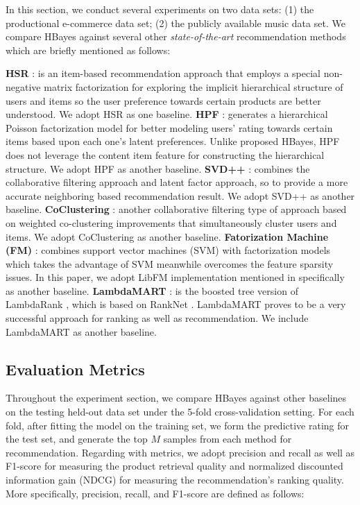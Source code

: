 In this section, we conduct several experiments on two data sets: (1) the productional e-commerce data set; (2) the publicly available music data set.  We compare HBayes against several other \emph{state-of-the-art} recommendation methods which are briefly mentioned as follows:

{\noindent\textbf{HSR} \cite{wang2015exploring}: is an item-based recommendation approach that employs a special non-negative matrix factorization for exploring the implicit hierarchical structure of users and items so the user preference towards certain products are better understood.  We adopt HSR  as one baseline. \newline
\textbf{HPF} \cite{gopalan2015scalable}: generates a hierarchical Poisson factorization model for better modeling users' rating towards certain items based upon each one's latent preferences.  Unlike proposed HBayes, HPF does not leverage the content item feature for constructing the hierarchical structure. We adopt HPF as another baseline. \newline
\textbf{SVD++} \cite{mnih2008probabilistic, koren2008factorization}: combines the collaborative filtering approach and latent factor approach, so to provide a more accurate neighboring based recommendation result.  We adopt SVD++ as another baseline. \newline
\textbf{CoClustering} \cite{george2005scalable}: another collaborative filtering type of approach based on weighted co-clustering improvements that simultaneously cluster users and items.  We adopt CoClustering as another baseline. \newline
\textbf{Fatorization Machine (FM)} \cite{rendle2010factorization,rendle2012factorization}: combines support vector machines (SVM) with factorization models which takes the advantage of SVM meanwhile overcomes the feature sparsity issues.  In this paper, we adopt LibFM implementation mentioned in \cite{rendle2012factorization} specifically as another baseline. \newline
\textbf{LambdaMART} \cite{burges2010ranknet}: is the boosted tree version of LambdaRank \cite{donmez2009local}, which is based on RankNet \cite{burges2005learning}.  LambdaMART proves to be a very successful approach for ranking as well as recommendation.  We include LambdaMART as another baseline. \newline}

\subsection{Evaluation Metrics}
Throughout the experiment section, we compare HBayes against other baselines on the testing held-out data set under the 5-fold cross-validation setting.  For each fold, after fitting the model on the training set, we form the predictive rating for the test set, and generate the top $M$ samples from each method for recommendation.  Regarding with metrics, we adopt precision and recall as well as F1-score for measuring the product retrieval quality and normalized discounted information gain (NDCG) for measuring the recommendation's ranking quality.  More specifically, precision, recall, and F1-score are defined as follows:

